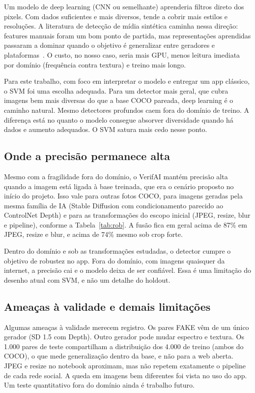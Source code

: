 \documentclass[12pt]{article}
\begin{document}
Um modelo de deep learning (CNN ou semelhante) aprenderia filtros direto dos pixels. Com dados suficientes e mais diversos, tende a cobrir mais estilos e resoluções. A literatura de detecção de mídia sintética caminha nessa direção: features manuais foram um bom ponto de partida, mas representações aprendidas passaram a dominar quando o objetivo é generalizar entre geradores e plataformas~\cite{bird2024cifake}. O custo, no nosso caso, seria mais GPU, menos leitura imediata por domínio (frequência contra textura) e treino mais longo.

Para este trabalho, com foco em interpretar o modelo e entregar um app clássico, o SVM foi uma escolha adequada. Para um detector mais geral, que cubra imagens bem mais diversas do que a base COCO pareada, deep learning é o caminho natural. Mesmo detectores profundos caem fora do domínio de treino. A diferença está no quanto o modelo consegue absorver diversidade quando há dados e aumento adequados. O SVM satura mais cedo nesse ponto.

\subsection{Onde a precisão permanece alta}

Mesmo com a fragilidade fora do domínio, o VerifAI mantém precisão alta quando a imagem está ligada à base treinada, que era o cenário proposto no início do projeto. Isso vale para outras fotos COCO, para imagens geradas pela mesma família de IA (Stable Diffusion com condicionamento parecido ao ControlNet Depth) e para as transformações do escopo inicial (JPEG, resize, blur e pipeline), conforme a Tabela~\ref{tab:rob}. A fusão fica em geral acima de 87\% em JPEG, resize e blur, e acima de 74\% mesmo sob crop forte.

Dentro do domínio e sob as transformações estudadas, o detector cumpre o objetivo de robustez no app. Fora do domínio, com imagens quaisquer da internet, a precisão cai e o modelo deixa de ser confiável. Essa é uma limitação do desenho atual com SVM, e não um detalhe do holdout.

\subsection{Ameaças à validade e demais limitações}

Algumas ameaças à validade merecem registro. Os pares FAKE vêm de um único gerador (SD 1.5 com Depth). Outro gerador pode mudar espectro e textura. Os 1{.}000 pares de teste compartilham a distribuição dos 4{.}000 de treino (ambos do COCO), o que mede generalização dentro da base, e não para a web aberta. JPEG e resize no notebook aproximam, mas não repetem exatamente o pipeline de cada rede social. A queda em imagens bem diferentes foi vista no uso do app. Um teste quantitativo fora do domínio ainda é trabalho futuro.
\end{document}
